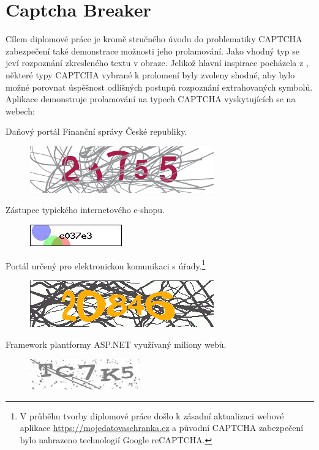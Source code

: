 \documentclass[
  field=ainfp,
  master=true,
  biblatex,
  sourcecodes=false,
  theorems=false,
  glossaries,
  index
]{kidiplom}
\begin{document}
\section{Captcha Breaker}
Cílem diplomové práce je kromě stručného úvodu do problematiky CAPTCHA zabezpečení také demonstrace možnosti jeho prolamování. Jako vhodný typ se jeví rozpoznání zkresleného textu v obraze. Jelikož hlavní inspirace pocházela z \cite{Kopp2016HowTM}, některé typy CAPTCHA vybrané k prolomení byly zvoleny shodné, aby bylo možné porovnat úspěšnost odlišných postupů rozpoznání extrahovaných symbolů. Aplikace demonstruje prolamování na typech CAPTCHA vyskytujících se na webech:
\begin{description}[align=left]
\item [adiseet.mfcr.cz] Daňový portál Finanční správy České republiky.
\begin{figure}[H]
  \centering
  \includegraphics[scale=0.5]{images/eet.png}
\end{figure}

\item [kamody.cz] Zástupce typického internetového e-shopu.
\begin{figure}[H]
  \centering
  \includegraphics{images/kamody.jpg}
\end{figure}

\item [mojedatovaschranka.cz] Portál určený pro elektronickou komunikaci s úřady.\footnote{V průběhu tvorby diplomové práce došlo k zásadní aktualizaci webové aplikace \url{https://mojedatovaschranka.cz} a původní CAPTCHA zabezpečení bylo nahrazeno technologií Google reCAPTCHA.}
\begin{figure}[H]
  \centering
  \includegraphics[scale=0.5]{images/datovka.png}
\end{figure}

\item [telerik.com] Framework plantformy ASP.NET využívaný miliony webů.
\begin{figure}[H]
  \centering
  \includegraphics{images/telerik.jpg}
\end{figure}


\end{description}
\end{document}
